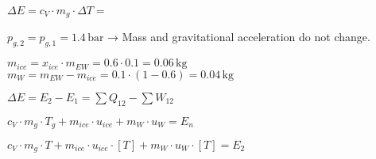 \( \Delta E = c_{V} \cdot m_{g} \cdot \Delta T = \)  

\( p_{g,2} = p_{g,1} = 1.4 \, \text{bar} \) → Mass and gravitational acceleration do not change.  

\( m_{ice} = x_{ice} \cdot m_{EW} = 0.6 \cdot 0.1 = 0.06 \, \text{kg} \)  
\( m_{W} = m_{EW} - m_{ice} = 0.1 \cdot (1 - 0.6) = 0.04 \, \text{kg} \)  

\( \Delta E = E_{2} - E_{1} = \sum Q_{12} - \sum W_{12} \)  

\( c_{V} \cdot m_{g} \cdot T_{g} + m_{ice} \cdot u_{ice} + m_{W} \cdot u_{W} = E_{n} \)  

\( c_{V} \cdot m_{g} \cdot T + m_{ice} \cdot u_{ice} \cdot [T] + m_{W} \cdot u_{W} \cdot [T] = E_{2} \)